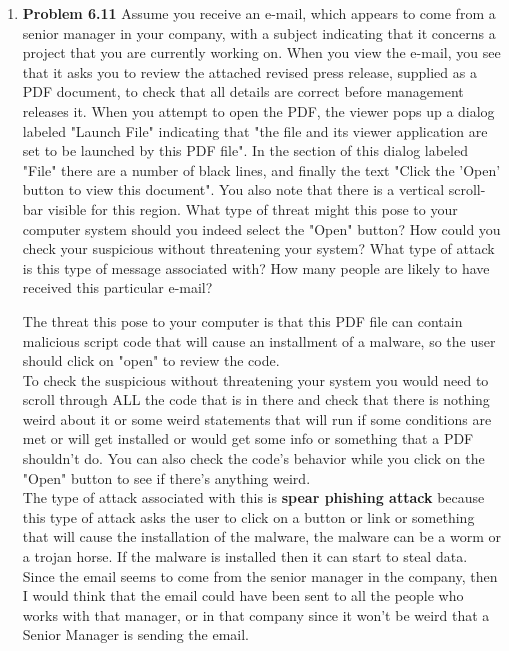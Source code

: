 \documentclass[12pt]{article}
\begin{document}
\begin{enumerate}
	\vspace{10pt}
	
	
	\item {\textbf{Problem 6.11} Assume you receive an e-mail, which appears to come from a senior manager in your company, with a subject indicating that it concerns a project that you are currently working on. When you view the e-mail, you see that it asks you to review the attached revised press release, supplied as a PDF document, to check that all details are correct before management releases it. When you attempt to open the PDF, the viewer pops up a dialog labeled "Launch File" indicating that "the file and its viewer application are set to be launched by this PDF file". In the section of this dialog labeled "File" there are a number of black lines, and finally the text "Click the 'Open' button to view this document". You also note that there is a vertical scroll-bar visible for this region. What type of threat might this pose to your computer system should you indeed select the "Open" button? How could you check your suspicious without threatening your system? What type of attack is this type of message associated with? How many people are likely to have received this particular e-mail? }


The threat this pose to your computer is that this PDF file can contain malicious script code that will cause an installment of a malware, so the user should click on "open" to review the code. \\ To check the suspicious without threatening your system you would need to scroll through ALL the code that is in there and check that there is nothing weird about it or some weird statements that will run if some conditions are met or will get installed or would get some info or something that a PDF shouldn't do. You can also check the code's behavior while you click on the "Open" button to see if there's anything weird. \\The type of attack associated with this  is \textbf{spear phishing attack} because this type of attack asks the user to click on a button or link or something that will cause the installation of the malware, the malware can be a worm or a trojan horse. If the malware is installed then it can start to steal data. \\ Since the email seems to come from the senior manager in the company, then I would think that the email could have been sent to all the people who works with that manager, or in that company since it won't be weird that a Senior Manager is sending the email. 
	
		\vspace{10pt}


	
    
\end{enumerate}
\end{document}
